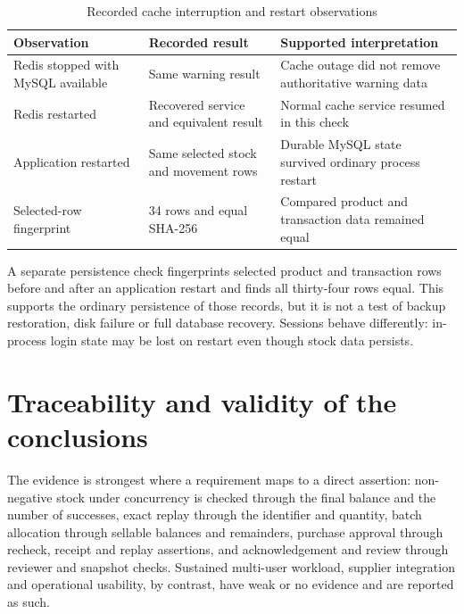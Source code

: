 \begin{table}[htbp]\centering\small{}\setlength{\tabcolsep}{3pt}\renewcommand{\arraystretch}{1.25}
\caption{Recorded cache interruption and restart observations}\label{tab:recovery}
\begin{tabular}{>{\raggedright\arraybackslash}p{}>{\raggedright\arraybackslash}p{}>{\raggedright\arraybackslash}p{}}
\toprule
\textbf{Observation} & \textbf{Recorded result} & \textbf{Supported interpretation} \\
\midrule
\leavevmode{}Redis stopped with MySQL available & \leavevmode{}Same warning result & \leavevmode{}Cache outage did not remove authoritative warning data \\
\leavevmode{}Redis restarted & \leavevmode{}Recovered service and equivalent result & \leavevmode{}Normal cache service resumed in this check \\
\leavevmode{}Application restarted & \leavevmode{}Same selected stock and movement rows & \leavevmode{}Durable MySQL state survived ordinary process restart \\
\leavevmode{}Selected-row fingerprint & \leavevmode{}34 rows and equal SHA-256 & \leavevmode{}Compared product and transaction data remained equal \\
\bottomrule\end{tabular}\end{table}

A separate persistence check fingerprints selected product and transaction rows before and after an application restart and finds all thirty-four rows equal. This supports the ordinary persistence of those records, but it is not a test of backup restoration, disk failure or full database recovery. Sessions behave differently: in-process login state may be lost on restart even though stock data persists.


\FloatBarrier

\section{Traceability and validity of the conclusions}

The evidence is strongest where a requirement maps to a direct assertion: non-negative stock under concurrency is checked through the final balance and the number of successes, exact replay through the identifier and quantity, batch allocation through sellable balances and remainders, purchase approval through recheck, receipt and replay assertions, and acknowledgement and review through reviewer and snapshot checks. Sustained multi-user workload, supplier integration and operational usability, by contrast, have weak or no evidence and are reported as such.


